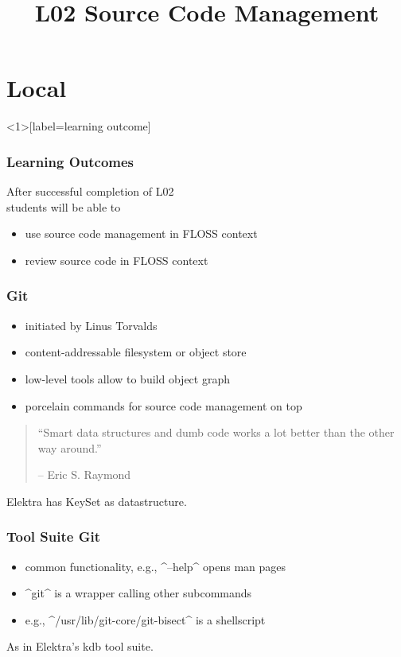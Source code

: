 

\title{L02 Source Code Management}



\section{Local}

\begin{frame}<1>[label=learning outcome]
	\frametitle{Learning Outcomes}
	After successful completion of L02 \\
	students will be able to

	\begin{itemize}
	\item use source code management in FLOSS context
	\item review source code in FLOSS context
	\end{itemize}
\end{frame}

\begin{frame}
	\frametitle{Git}

	\begin{itemize}
		\item initiated by Linus Torvalds
		\item content-addressable filesystem or object store
		\item low-level tools allow to build object graph
		\item porcelain commands for source code management on top
	\end{itemize}
	\vspace{1cm}

	\begin{quote}
	``Smart data structures and dumb code works a lot better than the other way around.''

	-- Eric S. Raymond
	\end{quote}
	\vspace{1cm}

	Elektra has KeySet as datastructure.
\end{frame}

\begin{frame}[fragile]
	\frametitle{Tool Suite Git}

	\begin{itemize}
		\item common functionality, e.g., ^--help^ opens man pages
		\item ^git^ is a wrapper calling other subcommands
		\item e.g., ^/usr/lib/git-core/git-bisect^ is a shellscript
	\end{itemize}
	\vspace{1cm}

	As in Elektra's kdb tool suite.
\end{frame}


